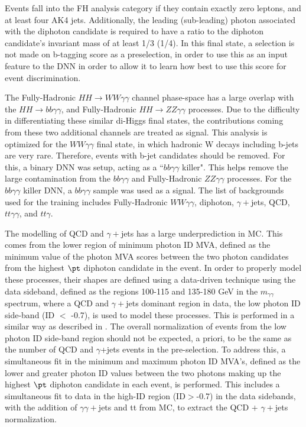 Events fall into the FH analysis category if they contain exactly zero leptons, and at least four AK4 jets. Additionally,
the leading (sub-leading) photon \pt associated with the diphoton candidate is required to have a ratio to the diphoton candidate's 
invariant mass of at least 1/3 (1/4). In this final state, a selection is not made on b-tagging score as a preselection, in order to use this as an 
input feature to the DNN in order to allow it to learn how best to use this score for event discrimination.

The Fully-Hadronic $HH\rightarrow WW\gamma\gamma$ channel phase-space has a large overlap with the $HH\rightarrow bb\gamma\gamma$,
and Fully-Hadronic $HH\rightarrow ZZ\gamma\gamma$ processes. Due to the difficulty in differentiating these similar di-Higgs final states, the contributions coming from these two additional channels
are treated as signal. This analysis is optimized for the $WW\gamma\gamma$ final state, in which hadronic W decays including b-jets are very rare. Therefore, events with b-jet candidates should be removed.
For this, a binary DNN was setup, acting as a ``$bb\gamma\gamma$ killer".
This helps remove the large contamination from the $bb\gamma\gamma$ and Fully-Hadronic $ZZ\gamma\gamma$ processes.
For the $bb\gamma\gamma$ killer DNN, a $bb\gamma\gamma$ sample was used as a signal. The list
of backgrounds used for the training includes Fully-Hadronic $WW\gamma\gamma$, diphoton, $\gamma+$jets, QCD, $tt\gamma\gamma$, and $tt\gamma$.

The modelling of QCD and $\gamma+$jets has a large underprediction in MC. This comes from the lower region of minimum photon ID MVA, defined as the minimum value of the photon MVA scores 
between the two photon candidates from the highest $\pt$ diphoton candidate in the event. In order to properly model these processes,
their shapes are defined using a data-driven technique using the data sideband, defined as the regions 100-115 and 135-180 GeV in the $m_{\gamma\gamma}$ spectrum, 
where a QCD and $\gamma+$jets dominant region in data, the low photon ID side-band (ID $<$ -0.7), is used to model these processes. 
This is performed in a similar way as described in \cite{Sirunyan:2020sum}.
The overall normalization of events from the low photon ID
side-band region should not be expected, a priori, to be the same as the number of QCD and $\gamma$+jets events in the pre-selection.
To address this, a simultaneous fit in the minimum and maximum photon ID MVA's, defined as the lower and greater photon ID values between the two photons making up the 
highest $\pt$ diphoton candidate in each event, is performed. This includes a simultaneous fit to data in the high-ID region (ID$>$-0.7) in the data sidebands, with the addition of 
$\gamma\gamma+$jets and tt from MC, to extract the QCD $+$ $\gamma+$jets normalization.

